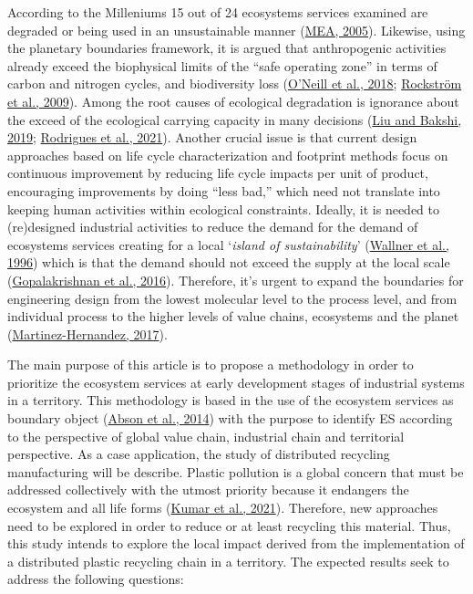 \documentclass[]{elsarticle} %
\begin{document}
According to the Milleniums 15 out of 24 ecosystems services examined are degraded or being used in an unsustainable manner (\protect\hyperlink{ref-MEA2005}{MEA, 2005}).
Likewise, using the planetary boundaries framework, it is argued that anthropogenic activities already exceed the biophysical limits of the ``safe operating zone'' in terms of carbon and nitrogen cycles, and biodiversity loss (\protect\hyperlink{ref-ONeill2018}{O'Neill et al., 2018}; \protect\hyperlink{ref-Rockstrom2009}{Rockström et al., 2009}).
Among the root causes of ecological degradation is ignorance about the exceed of the ecological carrying capacity in many decisions (\protect\hyperlink{ref-Liu2019g}{Liu and Bakshi, 2019}; \protect\hyperlink{ref-Rodrigues2021}{Rodrigues et al., 2021}).
Another crucial issue is that current design approaches based on life cycle characterization and footprint methods focus on continuous improvement by reducing life cycle impacts per unit of product, encouraging improvements by doing ``less bad,'' which need not translate into keeping human activities within ecological constraints.
Ideally, it is needed to (re)designed industrial activities to reduce the demand for the demand of ecosystems services creating for a local `\emph{island of sustainability}' (\protect\hyperlink{ref-Wallner1996}{Wallner et al., 1996}) which is that the demand should not exceed the supply at the local scale (\protect\hyperlink{ref-Gopalakrishnan2016}{Gopalakrishnan et al., 2016}).
Therefore, it's urgent to expand the boundaries for engineering design from the lowest molecular level to the process level, and from individual process to the higher levels of value chains, ecosystems and the planet (\protect\hyperlink{ref-Martinez-Hernandez2017}{Martinez-Hernandez, 2017}).

The main purpose of this article is to propose a methodology in order to prioritize the ecosystem services at early development stages of industrial systems in a territory.
This methodology is based in the use of the ecosystem services as boundary object (\protect\hyperlink{ref-Abson2014}{Abson et al., 2014}) with the purpose to identify ES according to the perspective of global value chain, industrial chain and territorial perspective.
As a case application, the study of distributed recycling manufacturing will be describe.
Plastic pollution is a global concern that must be addressed collectively with the utmost priority because it endangers the ecosystem and all life forms (\protect\hyperlink{ref-Kumar2021}{Kumar et al., 2021}).
Therefore, new approaches need to be explored in order to reduce or at least recycling this material.
Thus, this study intends to explore the local impact derived from the implementation of a distributed plastic recycling chain in a territory.
The expected results seek to address the following questions:
\end{document}
